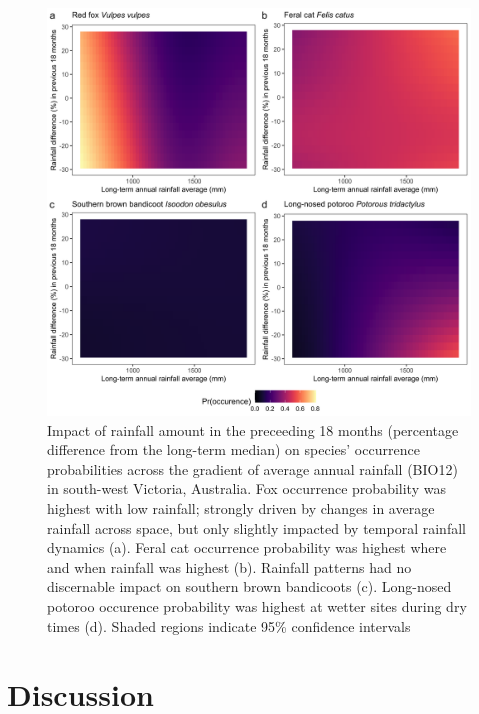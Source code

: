 \documentclass[11pt,a4paper,titlepage,twoside,openright]{style/unimelbthesis}
\begin{document}
\begin{mainmatter}
\(~\)

\(~\)

\(~\)
\begin{figure}

{\centering \includegraphics[width=1\linewidth]{figure/c1/rainfall} 

}

\caption{Impact of rainfall amount in the preceeding 18 months (percentage difference from the long-term median) on species' occurrence probabilities across the gradient of average annual rainfall (BIO12) in south-west Victoria, Australia. Fox occurrence probability was highest with low rainfall; strongly driven by changes in average rainfall across space, but only slightly impacted by temporal rainfall dynamics (a). Feral cat occurrence probability was highest where and when rainfall was highest (b). Rainfall patterns had no discernable impact on southern brown bandicoots (c). Long-nosed potoroo occurence probability was highest at wetter sites during dry times (d). Shaded regions indicate 95\% confidence intervals}\label{fig:rainfall}
\end{figure}
\newpage

\hypertarget{discussion}{%
\section{Discussion}\label{discussion}}


\end{mainmatter}
\end{document}
